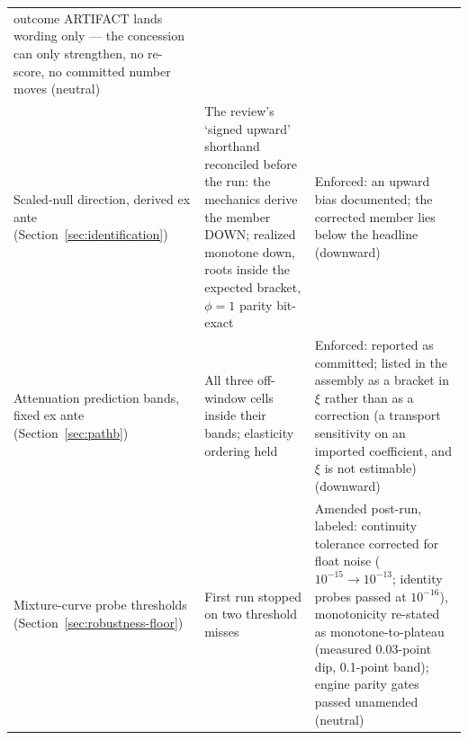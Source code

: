 \documentclass[12pt]{article}
\begin{document}
{\begin{longtable}{@{}p{4.4cm}p{4.2cm}p{5.6cm}@{}}
outcome ARTIFACT lands wording only --- the concession can only strengthen, no re-score, no committed number moves (neutral) \\ Scaled-null direction, derived ex ante (Section~\ref{sec:identification}) & The review's `signed upward' shorthand reconciled before the run: the mechanics derive the member DOWN; realized monotone down, roots inside the expected bracket, $\phi = 1$ parity bit-exact & Enforced: an upward bias documented; the corrected member lies below the headline (downward) \\ Attenuation prediction bands, fixed ex ante (Section~\ref{sec:pathb}) & All three off-window cells inside their bands; elasticity ordering held & Enforced: reported as committed; listed in the assembly as a bracket in $\xi$ rather than as a correction (a transport sensitivity on an imported coefficient, and $\xi$ is not estimable) (downward) \\ Mixture-curve probe thresholds (Section~\ref{sec:robustness-floor}) & First run stopped on two threshold misses & Amended post-run, labeled: continuity tolerance corrected for float noise ($10^{-15} \to 10^{-13}$; identity probes passed at $10^{-16}$), monotonicity re-stated as monotone-to-plateau (measured 0.03-point dip, 0.1-point band); engine parity gates passed unamended (neutral) \\
\bottomrule
\end{longtable}
}



\end{document}
